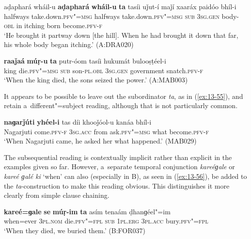 \begin{exe}
\ex
\label{ex:13-53}
\gll aḍaphará wháil-u \textbf{aḍaphará} \textbf{wháil-u} \textbf{ta} tasíi uǰut-í maǰí xaaráx paidóo bhíl-i \\
halfways take.down.\textsc{pfv"=msg} halfways  take.down.\textsc{pfv"=msg } \textsc{sub} \textsc{3sg.gen} body-\textsc{obl} in itching born become.\textsc{pfv-f} \\
\glt `He brought it partway down [the hill]. When he had brought it down that far, his whole body began itching.' (A:DRA020)

\ex
\label{ex:13-54}
\gll \textbf{raaǰaá} \textbf{múṛ-u} \textbf{ta} putr-óom tasíi hukumát bulooṣṭéel-i \\
king die.\textsc{pfv"=msg} \textsc{sub} son-\textsc{pl.obl} \textsc{3sg.gen}  government snatch.\textsc{pfv-f} \\
\glt `When the king died, the sons seized the power.' (A:MAB003)
\end{exe}

It appears to be possible to leave out the subordinator \textit{ta}, as in (\ref{ex:13-55}), and retain a~different"=subject reading, although that is not particularly common.

\begin{exe}
\ex
\label{ex:13-55}
\gll \textbf{naɡarǰúti} \textbf{yhéel-i} tas díi khooǰóol-u kanáa bhíl-i \\
Nagarjuti come.\textsc{pfv-f} \textsc{3sg.acc} from ask.\textsc{pfv"=msg}  what become.\textsc{pfv-f} \\
\glt `When Nagarjuti came, he asked her what happened.' (MAB029) 
\end{exe}

The subsequential reading is contextually implicit rather than explicit in the examples given so far. However, a~separate temporal conjunction \textit{kareéɡale} or \textit{kareé ɡalé ki} `when' can also (especially in B), as seen in (\ref{ex:13-56}), be added to the \textit{ta}-construction to make this reading obvious. This distinguishes it more clearly from simple clause chaining.

\begin{exe}
\ex
\label{ex:13-56}
\gll \textbf{kareé=ɡale} \textbf{se} \textbf{múṛ-im} \textbf{ta} asím tenaám ḍhanɡéel"=im \\
when=ever \textsc{3pl.nom} die.\textsc{pfv"=fpl} \textsc{sub} \textsc{1pl.erg} \textsc{3pl.acc} bury.\textsc{pfv"=fpl} \\
\glt `When they died, we buried them.' (B:FOR037) 
\end{exe}

